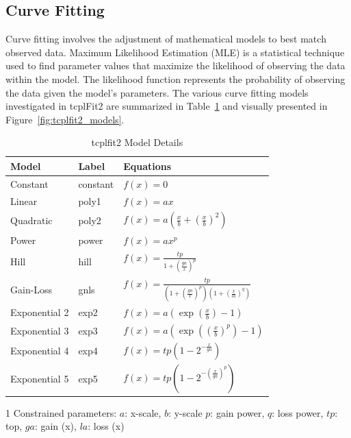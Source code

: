 \subsection{Curve Fitting}
Curve fitting involves the adjustment of mathematical models to best match observed data. Maximum Likelihood Estimation (MLE) is a statistical technique used to find parameter values that maximize the likelihood of observing the data within the model. The likelihood function represents the probability of observing the data given the model's parameters. The various curve fitting models investigated in tcplFit2 are summarized in Table~\ref{tab:tcplfit2_models} and visually presented in Figure~\ref{fig:tcplfit2_models}.

\begin{table}
    \centering
    \begin{threeparttable}[b]
    \caption{tcplfit2 Model Details}
    \begin{tabular}{lll}
    \toprule
    \textbf{Model} & \textbf{Label} & \textbf{Equations\tnote{1}} \\
    \midrule
    Constant & constant & \(f(x) = 0\) \\ 
    Linear & poly1 & \(f(x) = ax\) \\ 
    Quadratic & poly2 & \(f(x) = a\left(\frac{x}{b} + {\left(\frac{x}{b}\right)}^{2}\right)\) \\ 
    Power & power & \(f(x) = ax^p\) \\ 
    Hill & hill & \(f(x) = \frac{tp}{1 + {\left(\frac{ga}{x}\right)}^{p}}\) \\ 
    Gain-Loss & gnls & \(f(x) = \frac{tp}{(1 + {\left(\frac{ga}{x}\right)}^{p})(1 + {\left(\frac{x}{la}\right)}^{q})}\) \\ 
    Exponential 2 & exp2 & \(f(x) = a\left(\exp\left(\frac{x}{b}\right) - 1\right)\) \\
    Exponential 3 & exp3 & \(f(x) = a\left(\exp\left({\left(\frac{x}{b}\right)}^{p}\right) - 1\right)\) \\
    Exponential 4 & exp4 & \(f(x) = tp\left(1 - 2^{-\frac{x}{ga}}\right)\) \\
    Exponential 5 & exp5 & \(f(x) = tp{\left(1 - 2^{-(\frac{x}{ga})^{p}}\right)}\) \\
    \bottomrule
    \end{tabular}
    \begin{tablenotes}
        \item [1] Constrained parameters: $a$: x-scale, $b$: y-scale $p$: gain power, $q$: loss power, $tp$: top, $ga$: gain (x), $la$: loss (x)
    \end{tablenotes}
~\label{tab:tcplfit2_models}
\end{threeparttable}
\end{table}

